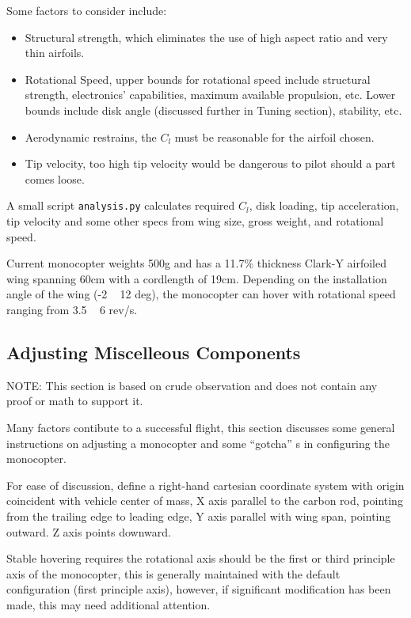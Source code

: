 \documentclass[12pt]{article}
\begin{document}
Some factors to consider include:
\begin{itemize}
  \item Structural strength, which eliminates the use of high aspect ratio and very thin airfoils.
  \item Rotational Speed, upper bounds for rotational speed include structural strength, electronics' capabilities, maximum available propulsion, etc. Lower bounds include disk angle (discussed further in Tuning section), stability, etc.
  \item Aerodynamic restrains, the $C_l$ must be reasonable for the airfoil chosen.
  \item Tip velocity, too high tip velocity would be dangerous to pilot should a part comes loose.
\end{itemize}

A small script \texttt{analysis.py} calculates required $C_l$, disk loading, tip acceleration, tip velocity and some other specs from wing size, gross weight, and rotational speed.

Current monocopter weights 500g and has a 11.7\% thickness Clark-Y airfoiled wing spanning 60cm with a cordlength of 19cm.
Depending on the installation angle of the wing (-2 ~ 12 deg), the monocopter can hover with rotational speed ranging from 3.5 ~ 6 rev/s. 


\subsection{Adjusting Miscelleous Components}
NOTE: This section is based on crude observation and does not contain any proof or math to support it.

Many factors contibute to a successful flight, this section discusses some general instructions on adjusting a monocopter and some ``gotcha'' s in configuring the monocopter.

For ease of discussion, define a right-hand cartesian coordinate system with origin coincident with vehicle center of mass, X axis parallel to the carbon rod, pointing from the trailing edge to leading edge, Y axis parallel with wing span, pointing outward. Z axis points downward.

Stable hovering requires the rotational axis should be the first or third principle axis of the monocopter, this is generally maintained with the default configuration (first principle axis), however, if significant modification has been made, this may need additional attention.
\end{document}
